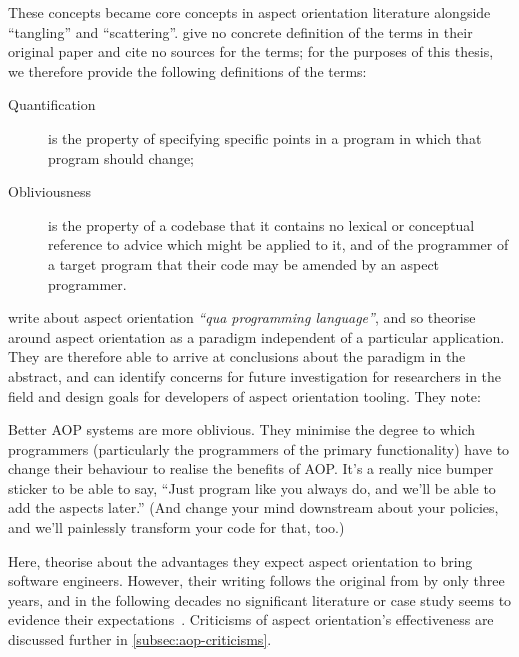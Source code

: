 These concepts became core concepts in aspect orientation literature alongside
``tangling'' and ``scattering''. \citeauthor{filman2000aspect} give no concrete
definition of the terms in their original paper and cite no sources for the
terms; for the purposes of this thesis, we therefore provide the following
definitions of the terms:

\begin{description}
  \item[Quantification] is the property of specifying specific points in a
  program in which that program should change;
\item[Obliviousness] is the property of a codebase that it contains no lexical
  or conceptual reference to advice which might be applied to it, and of the
  programmer of a target program that their code may be amended by an aspect
  programmer.
\end{description}

\citeauthor{filman2000aspect} write about aspect orientation \emph{``qua
  programming language''}, and so theorise around aspect orientation as a
paradigm independent of a particular application. They are therefore able to
arrive at conclusions about the paradigm in the abstract, and can identify
concerns for future investigation for researchers in the field and design goals
for developers of aspect orientation tooling. They note:

\begin{displayquote}
  Better AOP systems are more oblivious. They minimise the degree to which
  programmers (particularly the programmers of the primary functionality) have
  to change their behaviour to realise the benefits of AOP. It's a really nice
  bumper sticker to be able to say, ``Just program like you always do, and we'll
  be able to add the aspects later.'' (And change your mind downstream about
  your policies, and we'll painlessly transform your code for that,
  too.)~\cite{filman2000aspect}
\end{displayquote}

Here, \citeauthor{filman2000aspect} theorise about the advantages they expect
aspect orientation to bring software engineers. However, their writing follows
the original from \citet{kiczales1997aspect} by only three years, and in the
following decades no significant literature or case study seems to evidence
their expectations~\citep{steimann06paradoxical}. Criticisms of
aspect orientation's effectiveness are discussed further in
\cref{subsec:aop-criticisms}.

